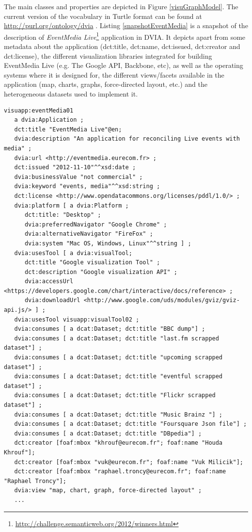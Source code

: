 The main classes and properties are depicted in Figure \ref{visuGraphModel}. The current version of the vocabulary in Turtle format can be found at \url{http://purl.org/ontology/dvia} .  Listing \ref{snapshotEventMedia} is a snapshot of the description of \textit{EventMedia Live}\footnote{\url{http://challenge.semanticweb.org/2012/winners.html}} application in DVIA. It depicts apart from some metadata about the application (dct:title, dct:name, dct:issued, dct:creator and dct:license), the different visualization libraries integrated for building EventMedia Live (e.g. The Google API, Backbone, etc), as well as the operating systems where it is designed for, the different views/facets available in the application (map, charts, graphs, force-directed layout, etc.) and the heterogeneous datasets used to implement it.

\begin{lstlisting}
visuapp:eventMedia01
   a dvia:Application ;
   dct:title "EventMedia Live"@en;
   dvia:description "An application for reconciling Live events with media" ;
   dvia:url <http://eventmedia.eurecom.fr> ;
   dct:issued "2012-11-10"^^xsd:date ;
   dvia:businessValue "not commercial" ;
   dvia:keyword "events, media"^^xsd:string ;
   dct:license <http://www.opendatacommons.org/licenses/pddl/1.0/> ;
   dvia:platform [ a dvia:Platform ;
      dct:title: "Desktop" ;
	  dvia:preferredNavigator "Google Chrome" ;
	  dvia:alternativeNavigator "FireFox" ;
	  dvia:system "Mac OS, Windows, Linux"^^string ] ;	
   dvia:usesTool [ a dvia:visualTool; 
      dct:title "Google visualization Tool" ;
	  dct:description "Google visualization API" ;
	  dvia:accessUrl <https://developers.google.com/chart/interactive/docs/reference> ;
	  dvia:downloadUrl <http://www.google.com/uds/modules/gviz/gviz-api.js/> ] ;
   dvia:usesTool visuapp:visualTool02 ;
   dvia:consumes [ a dcat:Dataset; dct:title "BBC dump"] ;
   dvia:consumes [ a dcat:Dataset; dct:title "last.fm scrapped dataset"] ;
   dvia:consumes [ a dcat:Dataset; dct:title "upcoming scrapped dataset"] ;
   dvia:consumes [ a dcat:Dataset; dct:title "eventful scrapped dataset"] ;
   dvia:consumes [ a dcat:Dataset; dct:title "Flickr scrapped dataset"] ;
   dvia:consumes [ a dcat:Dataset; dct:title "Music Brainz "] ;
   dvia:consumes [ a dcat:Dataset; dct:title "Foursquare Json file"] ;
   dvia:consumes [ a dcat:Dataset; dct:title "DBpedia"] ;
   dct:creator [foaf:mbox "khrouf@eurecom.fr"; foaf:name "Houda Khrouf"];
   dct:creator [foaf:mbox "vuk@eurecom.fr"; foaf:name "Vuk Milicik"];
   dct:creator [foaf:mbox "raphael.troncy@eurecom.fr"; foaf:name "Raphael Troncy"];
   dvia:view "map, chart, graph, force-directed layout" ;
   ...
\end{lstlisting}

